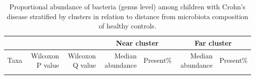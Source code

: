\newpage
{\footnotesize
	\renewcommand{\arraystretch}{0.7} \setlength{\tabcolsep}{3pt}
	\begin{longtable}{ | l | r | r | r | r | r | r  | }
		\caption[Proportional abundance of bacteria (genus level) among children with Crohn's disease stratified by clusters in relation to distance from microbiota composition of healthy controls.]{Proportional abundance of bacteria (genus level) among children with Crohn's disease stratified by clusters in relation to distance from microbiota composition of healthy controls.} 
		\label{TS3} \\
		
		\hline
		\multicolumn{3}{|c|}{} & \multicolumn{2}{c}{Near cluster}
		& \multicolumn{2}{|c|}{Far cluster}\\
		\hline 
		Taxa & Wilcoxon P value & Wilcoxon Q value & Median abundance & Present\% & Median abundance & Present\% \\ 
		\hline 
		\endfirsthead
		
		
		\endfoot
		
		\hline 
		\endlastfoot
		
		
		

\end{longtable}}
